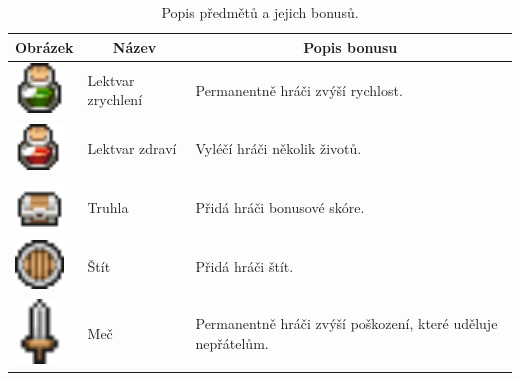 \begin{table}[htbp]
    \centering
    \begin{tabular}{|m{2cm}|m{2cm}|m{8cm}|}
    \hline
    \multicolumn{1}{|c|}{\textbf{Obrázek}} & \multicolumn{1}{c|}{\textbf{Název}} & \multicolumn{1}{c|}{\textbf{Popis bonusu}} \\
    \hline
    \hline
    \centering\includegraphics[width=1.3cm,height=1.3cm]{obrazky-figures/ch3/green_potion.png} & Lektvar zrychlení & Permanentně hráči zvýší rychlost. \\
    \hline
    \centering\includegraphics[width=1.3cm,height=1.3cm]{obrazky-figures/ch3/red_potion.png} & Lektvar zdraví & Vyléčí hráči několik životů. \\
    \hline
    \centering\includegraphics[width=1.3cm,height=1.3cm]{obrazky-figures/ch3/chests.png} & Truhla & Přidá hráči bonusové skóre. \\
    \hline
    \centering\includegraphics[width=1.3cm,height=1.3cm]{obrazky-figures/ch3/shield.png} & Štít & Přidá hráči štít. \\
    \hline
    \centering\includegraphics[width=1.3cm,height=1.7cm]{obrazky-figures/ch3/sword.png} & Meč & Permanentně hráči zvýší poškození, které uděluje nepřátelům.\\
    \hline
    \end{tabular}
    \caption{Popis předmětů a jejich bonusů.}
    \label{tab:přeměty}
\end{table}

